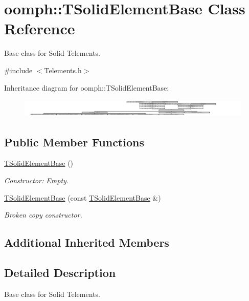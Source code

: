 \hypertarget{classoomph_1_1TSolidElementBase}{}\section{oomph\+:\+:T\+Solid\+Element\+Base Class Reference}
\label{classoomph_1_1TSolidElementBase}


Base class for Solid Telements.  




{\ttfamily \#include $<$Telements.\+h$>$}

Inheritance diagram for oomph\+:\+:T\+Solid\+Element\+Base\+:\begin{figure}[H]
\begin{center}
\leavevmode
\includegraphics[height=0.887681cm]{classoomph_1_1TSolidElementBase}
\end{center}
\end{figure}
\subsection*{Public Member Functions}
\begin{DoxyCompactItemize}
\item 
\hyperlink{classoomph_1_1TSolidElementBase_a9a561c86b6e491e77a550d6a69278142}{T\+Solid\+Element\+Base} ()
\begin{DoxyCompactList}\small\item\em Constructor\+: Empty. \end{DoxyCompactList}\item 
\hyperlink{classoomph_1_1TSolidElementBase_a69ac117fc8d0748b29f7dde3e3ee5973}{T\+Solid\+Element\+Base} (const \hyperlink{classoomph_1_1TSolidElementBase}{T\+Solid\+Element\+Base} \&)
\begin{DoxyCompactList}\small\item\em Broken copy constructor. \end{DoxyCompactList}\end{DoxyCompactItemize}
\subsection*{Additional Inherited Members}


\subsection{Detailed Description}
Base class for Solid Telements. 

